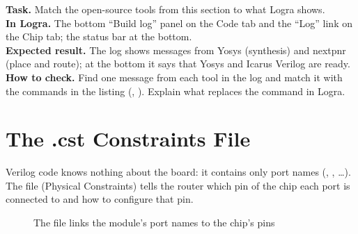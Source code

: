 \begin{diybox}
\textbf{Task.} Match the open-source tools from this section to what Logra shows.\\
\textbf{In Logra.} The bottom ``Build log'' panel on the Code tab and the ``Log'' link on the Chip tab; the status bar at the bottom.\\
\textbf{Expected result.} The log shows messages from Yosys (synthesis) and nextpnr (place and route); at the bottom it says that Yosys and Icarus Verilog are ready.\\
\textbf{How to check.} Find one message from each tool in the log and match it with the commands in the listing (, ).  Explain what replaces the  command in Logra.
\end{diybox}

\section{The .cst Constraints File}
\label{sec:cst}

Verilog code knows nothing about the board: it contains only port names
(, , \ldots). The  file (Physical
Constraints) tells the router which pin
of the chip each port is connected to and how to configure that pin.

\begin{figure}[H]
\centering
{}
\caption{The  file links the module's port names to the chip's pins}
\end{figure}

